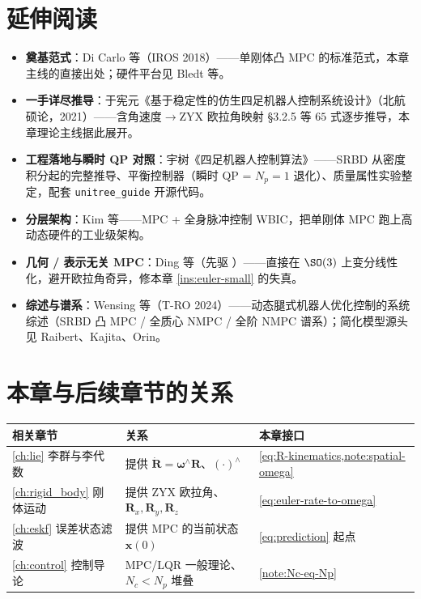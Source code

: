 \section*{延伸阅读}
\begin{itemize}
  \item \textbf{奠基范式}：Di Carlo 等\cite{dicarlo2018cheetah}（IROS 2018）——单刚体凸 MPC 的标准范式，本章主线的直接出处；硬件平台见 Bledt 等\cite{bledt2018cheetah3}。
  \item \textbf{一手详尽推导}：于宪元《基于稳定性的仿生四足机器人控制系统设计》\cite{yu2021quadruped}（北航硕论，2021）——含角速度$\to$ZYX 欧拉角映射 §3.2.5 等 $65$ 式逐步推导，本章理论主线据此展开。
  \item \textbf{工程落地与瞬时 QP 对照}：宇树《四足机器人控制算法》\cite{unitree2023quadruped}——SRBD 从密度积分起的完整推导、平衡控制器（瞬时 QP = $N_p{=}1$ 退化）、质量属性实验整定，配套 \texttt{unitree\_guide} 开源代码。
  \item \textbf{分层架构}：Kim 等\cite{kim2019wbic}——MPC + 全身脉冲控制 WBIC，把单刚体 MPC 跑上高动态硬件的工业级架构。
  \item \textbf{几何 / 表示无关 MPC}：Ding 等\cite{ding2021repfree}（先驱 \cite{ding2019realtime}）——直接在 $\SO(3)$ 上变分线性化，避开欧拉角奇异，修本章 \cref{ins:euler-small} 的失真。
  \item \textbf{综述与谱系}：Wensing 等\cite{wensing2024legged}（T-RO 2024）——动态腿式机器人优化控制的系统综述（SRBD 凸 MPC / 全质心 NMPC / 全阶 NMPC 谱系）；简化模型源头见 Raibert\cite{raibert1986legged}、Kajita\cite{kajita2001lipm}、Orin\cite{orin2013centroidal}。
\end{itemize}

\section*{本章与后续章节的关系}
\begin{table}[H]\centering\small
\begin{tabular}{lll}
\toprule
相关章节 & 关系 & 本章接口 \\
\midrule
\cref{ch:lie} 李群与李代数 & 提供 $\dot{\mathbf{R}}=\boldsymbol{\omega}^\wedge\mathbf{R}$、$(\cdot)^\wedge$ & \cref{eq:R-kinematics,note:spatial-omega} \\
\cref{ch:rigid_body} 刚体运动 & 提供 ZYX 欧拉角、$\mathbf{R}_x,\mathbf{R}_y,\mathbf{R}_z$ & \cref{eq:euler-rate-to-omega} \\
\cref{ch:eskf} 误差状态滤波 & 提供 MPC 的当前状态 $\boldsymbol{x}(0)$ & \cref{eq:prediction} 起点 \\
\cref{ch:control} 控制导论 & MPC/LQR 一般理论、$N_c{<}N_p$ 堆叠 & \cref{note:Nc-eq-Np} \\
\bottomrule
\end{tabular}
\end{table}


